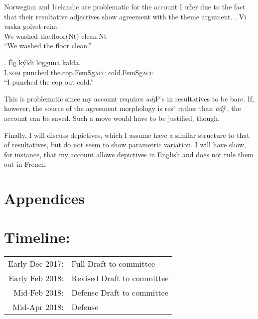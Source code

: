 \documentclass[letterpaper,12pt]{article}
\begin{document}
Norwegian and Icelandic are problematic for the account I offer due to the fact that their resultative adjectives show agreement with the theme argument.
\exg. Vi vaska golvet reint {\parencite[Norwegian][]{kratzer_building_2004}}\\
We washed the.floor(Nt) clean.Nt\\
``We washed the floor clean.''

\exg. \'Eg k\'yldi l\"ogguna kalda. {\parencite[Icelandic][]{whelpton2007building}}\\
I.\textsc{nom} punched the.cop.FemSg\textsc{acc} cold.FemSg\textsc{acc} { }\\
``I punched the cop out cold.''

This is problematic since my account requires \textit{adj}P's in resultatives to be bare.
If, however, the source of the agreement morphology is res$^\circ$ rather than \textit{adj}$^\circ$, the account can be saved.
Such a move would have to be justified, though.

Finally, I will discuss depictives, which I assume have a similar structure to that of resultatives, but do not seem to show parametric variation.
I will have show, for instance, that my account allows depictives in English and does not rule them out in French.

\section{Appendices}
\begin{refsection}
  \nocite{milway2015generals,milway2013forum,milway2016dogdays}
  \printbibliography[heading=none]
\end{refsection}
\section{Timeline:}
\begin{tabular}[t]{rl}
  Early Dec 2017: & Full Draft to committee \\
  Early Feb 2018: & Revised Draft to committee \\
  Mid-Feb 2018: & Defense Draft to committee \\
  Mid-Apr 2018: & Defense \\
\end{tabular}
\nocite{napoli1992secondary}
\printbibliography
\end{document}
